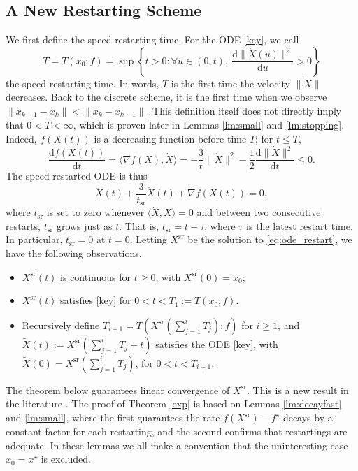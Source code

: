 \documentclass[twoside,11pt]{article}
\newcommand{\norm}[1]{\|#1\|}
\newcommand{\xsr}{X^{\mathrm{sr}}}
\newcommand{\tsr}{t_{\mathrm{sr}}}
\renewcommand{\d}{{\mathrm{d}}}
\begin{document}
\subsection{A New Restarting Scheme}
\label{sec:speed-restarting}
We first define the speed restarting time. For the ODE \eqref{key}, we call
\begin{equation}\nonumber
T =  T(x_0; f) = \sup \left\{t > 0: \forall u\in (0, t), ~ \frac{\d\norm{\dot X(u)}^2}{\d u} > 0 \right\}
\end{equation}
the speed restarting time. In words, $T$ is the first time the velocity $\|\dot X\|$ decreases. Back to the discrete scheme, it is the first time when we observe $\|x_{k+1} - x_k\| < \|x_k - x_{k-1}\|$. This definition itself does not directly imply that $0 < T < \infty$, which is proven later in Lemmas \ref{lm:small} and \ref{lm:stopping}. Indeed, $f(X(t))$ is a decreasing function before time $T$; for $t\le T$,
\begin{equation}\nonumber
\frac{\d f(X(t))}{\d t} =\langle \nabla f(X),\dot X\rangle = -\frac{3}{t}\norm{\dot X}^2 - \frac{1}{2}\frac{\d\norm{\dot X}^2}{\mathrm{d} t} \le 0.
\end{equation}
The speed restarted ODE is thus 
\begin{equation}\label{eq:ode_restart}
\ddot X(t) + \frac{3}{\tsr}\dot X(t) + \nabla f(X(t)) = 0,
\end{equation}
where $\tsr$ is set to zero whenever $\langle \dot X, \ddot X\rangle = 0$ and between two consecutive restarts, $\tsr$ grows just as $t$. That is, $\tsr = t - \tau$, where $\tau$ is the latest restart time. In particular, $\tsr = 0$ at $t = 0$. Letting $\xsr$ be the solution to \eqref{eq:ode_restart}, we have the following observations.
\begin{itemize}
\item 
$\xsr(t)$ is continuous for $t \geq 0$, with $\xsr(0) = x_0$;
\item
$\xsr(t)$ satisfies \eqref{key} for $0 < t < T_1 := T(x_0; f)$.
\item
Recursively define $T_{i+1} = T\left( \xsr\left(\sum_{j=1}^i T_j\right); f\right)$ for $i \ge 1$, and $\widetilde X(t) := \xsr\left(\sum_{j=1}^i T_j + t \right)$ satisfies  the ODE \eqref{key}, with $\widetilde X(0) = \xsr \left( \sum_{j=1}^i T_j \right)$, for $0 < t < T_{i+1}$.
\end{itemize}


The theorem below guarantees linear convergence of $\xsr$. This is a new result in the literature \citep{restart,restarting_gatech}. The proof of Theorem \ref{exp} is based on Lemmas \ref{lm:decayfast} and \ref{lm:small}, where the first guarantees the rate $f(\xsr) - f^\star$ decays by a constant factor for each restarting, and the second confirms that restartings are adequate. In these lemmas we all make a convention that the uninteresting case $x_0 = x^\star$ is excluded.
\end{document}
